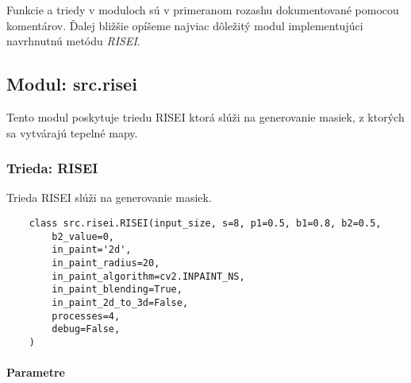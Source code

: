 Funkcie a triedy v moduloch sú v primeranom rozashu dokumentované pomocou komentárov. Ďalej bližšie opíšeme najviac dôležitý modul implementujúci navrhnutnú metódu \textit{RISEI}.

\subsection{Modul: src.risei}

Tento modul poskytuje triedu RISEI ktorá slúži na generovanie masiek, z ktorých sa vytvárajú tepelné mapy.

\subsubsection{Trieda: RISEI}

Trieda RISEI slúži na generovanie masiek.

\begin{lstlisting}
    class src.risei.RISEI(input_size, s=8, p1=0.5, b1=0.8, b2=0.5,
        b2_value=0,
        in_paint='2d',
        in_paint_radius=20,
        in_paint_algorithm=cv2.INPAINT_NS,
        in_paint_blending=True,
        in_paint_2d_to_3d=False,
        processes=4,
        debug=False,
    )
\end{lstlisting}

\paragraph{Parametre}

